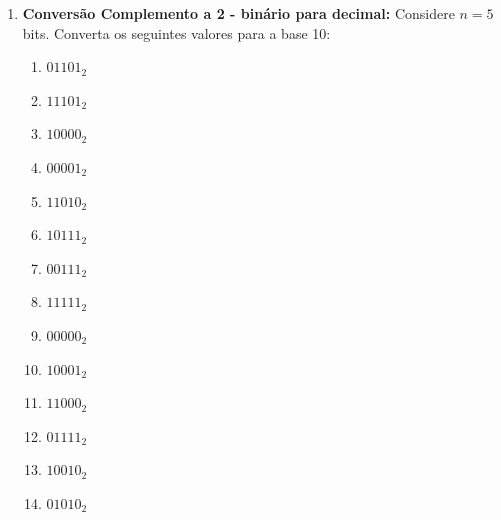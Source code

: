 \begin{enumerate}
          Responda:
          \begin{enumerate}
              \item O número $+16$ pode ser representado com 5 bits em Complemento a 2? Justifique.
              \item Qual é a faixa (range) de valores decimais representáveis com 5 bits em Complemento a 2?
              \item Qual a principal diferença entre a representação do zero em Complemento a 1 e Complemento a 2?
              \item Explique a regra prática "inverte tudo e soma 1" para encontrar o correspondente negativo de um número.
          \end{enumerate}
    \item \textbf{Conversão Complemento a 2 - binário para decimal:}
          Considere $n = 5$ bits. Converta os seguintes valores para a base 10:

          \begin{enumerate}
              \item $01101_2$
              \item $11101_2$
              \item $10000_2$
              \item $00001_2$
              \item $11010_2$
              \item $10111_2$
              \item $00111_2$
              \item $11111_2$
              \item $00000_2$
              \item $10001_2$
              \item $11000_2$
              \item $01111_2$
              \item $10010_2$
              \item $01010_2$
          \end{enumerate}


\end{enumerate}
